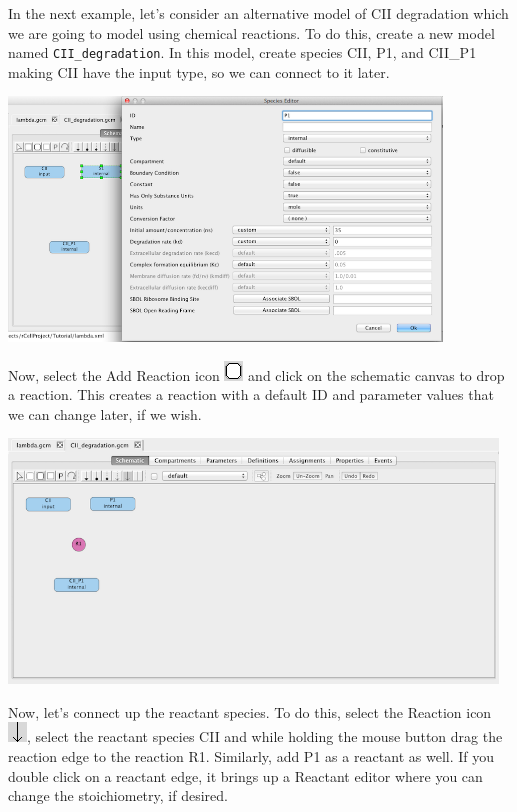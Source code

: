 \documentclass[titlepage,11pt]{article}
\begin{document}
In the next example, let's consider an alternative model of CII degradation which we are going to model using chemical reactions.  To do this, create a new model named {\tt CII\_degradation}.  In this model, create species CII, P1, and CII\_P1 making CII have the input type, so we can connect to it later.  

\begin{center}
\includegraphics[height=65mm]{screenshots/P1}
\end{center}

Now, select the Add Reaction icon \includegraphics{../gui/icons/modelview/add_reaction_selected} and click on the schematic canvas to drop a reaction.  This creates a reaction with a default ID and parameter values that we can change later, if we wish.

\begin{center}
\includegraphics[height=65mm]{screenshots/reaction}
\end{center}

Now, let's connect up the reactant species.  To do this, select the Reaction icon \includegraphics{../gui/icons/modelview/reaction_selected}, select the reactant species CII and while holding the mouse button drag the reaction edge to the reaction R1.  Similarly, add P1 as a reactant as well.  If you double click on a reactant edge, it brings up a Reactant editor where you can change the stoichiometry, if desired.
\end{document}

